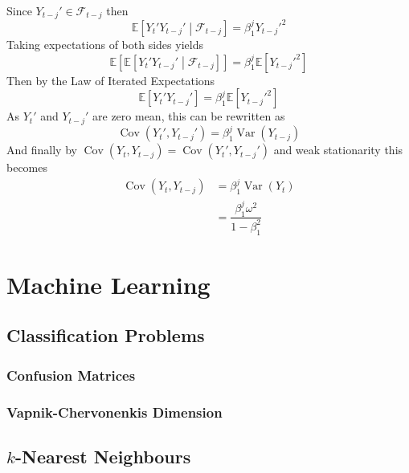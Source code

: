 \documentclass[11pt]{report} %
\begin{document}
Since $Y_{t - j}' \in \mathcal{F}_{t- j}$ then
\begin{equation}
\mathbb{E}\left[Y_{t}'Y_{t - j}'\middle|\mathcal{F}_{t-j}\right] = \beta_{1}^{j}Y_{t - j}'^{2}
\end{equation}
Taking expectations of both sides yields
\begin{equation}
\mathbb{E}\left[\mathbb{E}\left[Y_{t}'Y_{t - j}'\middle|\mathcal{F}_{t-j}\right]\right] = \beta_{1}^{j}\mathbb{E}\left[Y_{t - j}'^{2}\right]
\end{equation}
Then by the Law of Iterated Expectations
\begin{equation}
\mathbb{E}\left[Y_{t}'Y_{t - j}'\right] = \beta_{1}^{j}\mathbb{E}\left[Y_{t - j}'^{2}\right]
\end{equation}
As $Y_{t}'$ and $Y_{t - j}'$ are zero mean, this can be rewritten as
\begin{equation}
\operatorname{Cov}\left(Y_{t}', Y_{t - j}'\right) = \beta_{1}^{j}\operatorname{Var}\left(Y_{t - j}\right)
\end{equation}
And finally by $\operatorname{Cov}\left(Y_{t}, Y_{t - j}\right) = \operatorname{Cov}\left(Y_{t}', Y_{t - j}'\right)$ and weak stationarity this becomes
\begin{align}
\operatorname{Cov}\left(Y_{t}, Y_{t - j}\right) &= \beta_{1}^{j}\operatorname{Var}\left(Y_{t}\right) \\
&= \dfrac{\beta_{1}^{j}\omega^{2}}{1 - \beta_{1}^{2}}
\end{align}

\chapter{Machine Learning}


\section{Classification Problems}

\subsection{Confusion Matrices}

\subsection{Vapnik-Chervonenkis Dimension}

\section{$k$-Nearest Neighbours}
\end{document}
